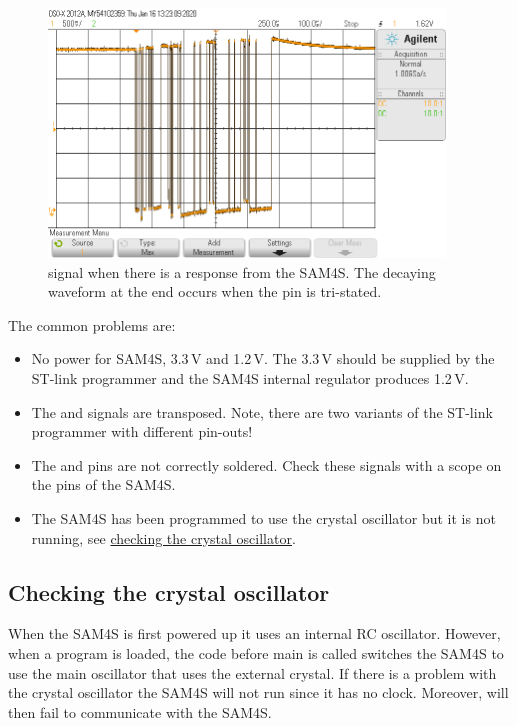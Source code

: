 \begin{figure}[!h]
\centering
\includegraphics[height=2.60417in]{figs/OpenOCDPollingGood.png}
\caption{ signal when there is a response from the SAM4S.
  The decaying waveform at the end occurs when the pin is tri-stated.}
\label{fig:openocd-response}
\end{figure}


The common problems are:
%
\begin{itemize}
\item No power for SAM4S, 3.3\,V and 1.2\,V.  The 3.3\,V should be
  supplied by the ST-link programmer and the SAM4S internal regulator
  produces 1.2\,V.

\item The  and  signals are transposed.  Note, there
  are two variants of the ST-link programmer with different pin-outs!

\item The  and  pins are not correctly soldered.
  Check these signals with a scope on the pins of the SAM4S.

\item The SAM4S has been programmed to use the crystal oscillator but
  it is not running, see
  \protect\hyperref[checking-the-crystal-oscillator]{checking the
    crystal oscillator}.
\end{itemize}



\subsection{Checking the crystal oscillator}
\label{checking-the-crystal-oscillator}

When the SAM4S is first powered up it uses an internal RC oscillator.
However, when a program is loaded, the code before main is called
switches the SAM4S to use the main oscillator that uses the external
crystal.  If there is a problem with the crystal oscillator the SAM4S
will not run since it has no clock.  Moreover,  will
then fail to communicate with the SAM4S.

